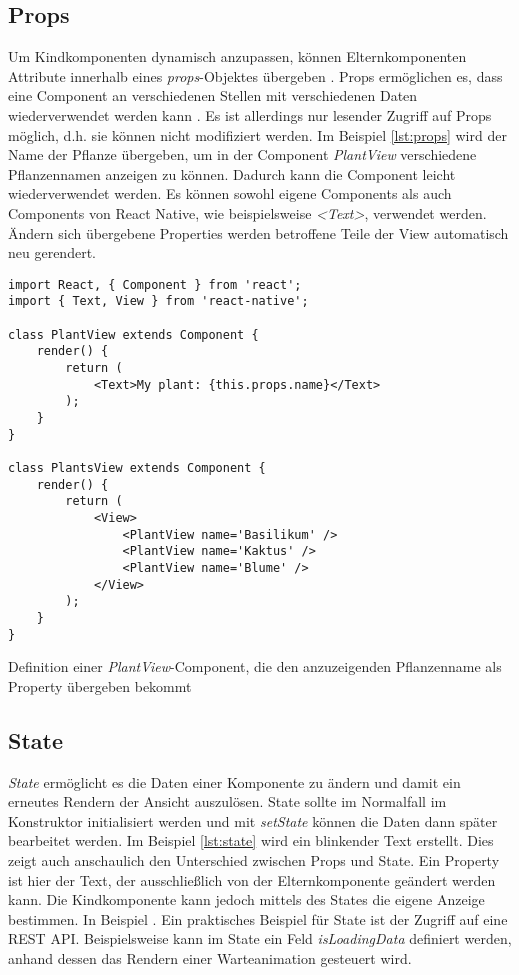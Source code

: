 \subsection{Props}
Um Kindkomponenten dynamisch anzupassen, können Elternkomponenten Attribute innerhalb eines \textit{props}-Objektes übergeben \cite{facebook_inc._components_2017}. Props ermöglichen es, dass eine Component an verschiedenen Stellen mit verschiedenen Daten wiederverwendet werden kann \cite{facebook_inc._props_2017}. Es ist allerdings nur lesender Zugriff auf Props möglich, d.h. sie können nicht modifiziert werden. Im Beispiel \ref{lst:props} wird der Name der Pflanze übergeben, um in der Component \textit{PlantView} verschiedene Pflanzennamen anzeigen zu können. Dadurch kann die Component leicht wiederverwendet werden. Es können sowohl eigene Components als auch Components von React Native, wie beispielsweise \textit{<Text>}, verwendet werden. Ändern sich übergebene Properties werden betroffene Teile der View automatisch neu gerendert.
\begin{listing}[H]
    \begin{verbatim}
import React, { Component } from 'react';
import { Text, View } from 'react-native';

class PlantView extends Component {
    render() {
        return (
            <Text>My plant: {this.props.name}</Text>
        );
    }
}

class PlantsView extends Component {
    render() {
        return (
            <View>
                <PlantView name='Basilikum' />
                <PlantView name='Kaktus' />
                <PlantView name='Blume' />
            </View>
        );
    }
}

    \end{verbatim}
    \caption{Definition einer \textit{PlantView}-Component, die den anzuzeigenden Pflanzenname als Property übergeben bekommt}
    \label{lst:props}
\end{listing}

\subsection{State}
\textit{State} ermöglicht es die Daten einer Komponente zu ändern und damit ein erneutes Rendern der Ansicht auszulösen. State sollte im Normalfall im Konstruktor initialisiert werden und mit \textit{setState} können die Daten dann später bearbeitet werden. Im Beispiel \ref{lst:state} wird ein blinkender Text erstellt. Dies zeigt auch anschaulich den Unterschied zwischen Props und State. Ein Property ist hier der Text, der ausschließlich von der Elternkomponente geändert werden kann. Die Kindkomponente kann jedoch mittels des States die eigene Anzeige bestimmen. In Beispiel \cite{facebook_inc._state_2017}. Ein praktisches Beispiel für State ist der Zugriff auf eine REST API. Beispielsweise kann im State ein Feld \textit{isLoadingData} definiert werden, anhand dessen das Rendern einer Warteanimation gesteuert wird.

